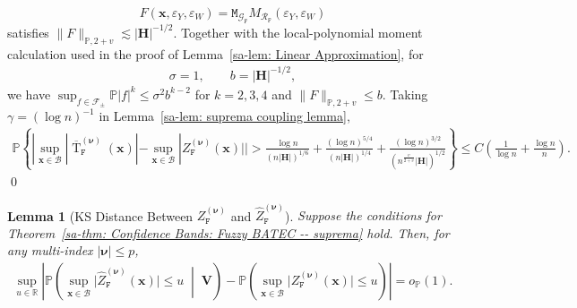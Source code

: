 \documentclass[10pt]{article}
\newtheorem{lem}{Lemma}
\DeclareMathOperator{\Tstat}{T}
\renewcommand{\P}{\mathbb{P}}
\newcommand{\reals}{\mathbb{R}}
\newcommand{\bH}{\mathbf{H}}
\newcommand{\bV}{\mathbf{V}}
\newcommand{\bx}{\mathbf{x}}
\newcommand{\bnu}{\boldsymbol{\nu}}
\newcommand{\B}{\mathcal{B}}
\newcommand{\F}{\mathcal{F}}
\newcommand{\G}{\mathcal{G}}
\newcommand{\R}{\mathcal{R}}
\newcommand{\ttF}{\mathtt{F}}
\newcommand{\ttM}{\mathtt{M}}
\begin{document}
\[
    F(\bx, \varepsilon_Y, \varepsilon_W) = \ttM_{\G_{\ttF}} M_{\R_{\ttF}}(\varepsilon_Y, \varepsilon_W)
\]
satisfies $\|F\|_{\P,2+v}\lesssim |\bH|^{-1/2}$. Together with the local-polynomial moment calculation used in the proof of Lemma~\ref{sa-lem: Linear Approximation}, for
\begin{align*}
    \sigma = 1, \qquad b = |\bH|^{-1/2},
\end{align*}
we have $\sup_{f \in \F_{\pm}} \P|f|^k \le \sigma^2 b^{k-2}$ for $k = 2, 3, 4$ and $\|F\|_{\P,2+v} \le b$.
Taking $\gamma = (\log n)^{-1}$ in Lemma~\ref{sa-lem: suprema coupling lemma},
\begin{align*}
    \P\left\{ |\sup_{\bx \in \B} |\overline{\Tstat}^{(\bnu)}_{\mathtt{F}}(\bx)| - \sup_{\bx \in \B} |Z^{(\bnu)}_{\mathtt{F}}(\bx)|| > \frac{\log n}{(n |\bH|)^{1/6}} + \frac{(\log n)^{5/4}}{(n |\bH|)^{1/4}} + \frac{(\log n)^{3/2}}{(n^{\frac{v}{2+v}} |\bH|)^{1/2}}\right\} \le C \left( \frac{1}{\log n} + \frac{\log n}{n} \right).
\end{align*}
\qed

\begin{lem}[KS Distance Between $Z_{\mathtt{F}}^{(\bnu)}$ and $\widehat{Z}_{\mathtt{F}}^{(\bnu)}$]\label{sa-lem: feasible fuzzy gaussian to infeasible fuzzy gaussian}
Suppose the conditions for Theorem~\ref{sa-thm: Confidence Bands: Fuzzy BATEC -- suprema} hold. Then, for any multi-index $|\bnu|\leq p$,
\begin{align*}
    \sup_{u \in \reals}
    \left|
    \P \left( \sup_{\bx \in \B} \big| \widehat{Z}_{\mathtt{F}}^{(\bnu)}(\bx) \big| \leq u \;\middle|\; \bV \right)
    - \P \left( \sup_{\bx \in \B} \big| Z_{\mathtt{F}}^{(\bnu)}(\bx) \big| \leq u \right)
    \right|
    = o_{\P}(1).
\end{align*}
\end{lem}
\end{document}
